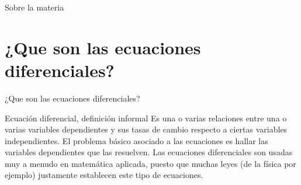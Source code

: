 \documentclass[handout,hyperref={colorlinks=true}]{beamer}
\begin{document}
\begin{frame}{Sobre la materia}
\begin{itemize}
\end{itemize}

\end{frame}

\section{¿Que son las ecuaciones diferenciales?}
\begin{frame}{¿Que son las ecuaciones diferenciales?}

\begin{block}{Ecuación diferencial, definición informal}
 Es una o varias relaciones entre una o varias variables dependientes y sus tasas de cambio respecto a ciertas variables independientes. El problema básico asociado
 a las ecuaciones es hallar las variables dependientes que las resuelven. Las ecuaciones diferenciales son usadas muy a menudo en matemática aplicada, puesto que muchas 
 leyes (de la física por ejemplo) justamente establecen este tipo de ecuaciones. 
\end{block}



\end{frame}
\end{document}

